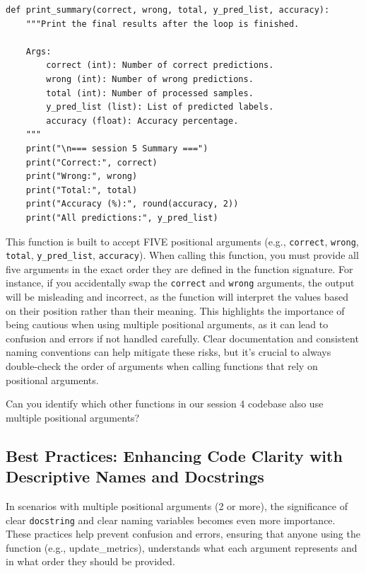\begin{verbatim}
def print_summary(correct, wrong, total, y_pred_list, accuracy):
    """Print the final results after the loop is finished.

    Args:
        correct (int): Number of correct predictions.
        wrong (int): Number of wrong predictions.
        total (int): Number of processed samples.
        y_pred_list (list): List of predicted labels.
        accuracy (float): Accuracy percentage.
    """
    print("\n=== session 5 Summary ===")
    print("Correct:", correct)
    print("Wrong:", wrong)
    print("Total:", total)
    print("Accuracy (%):", round(accuracy, 2))
    print("All predictions:", y_pred_list)     
\end{verbatim}

This function is built to accept FIVE  positional arguments (e.g., \texttt{correct}, \texttt{wrong}, \texttt{total}, \texttt{y\_pred\_list}, \texttt{accuracy}). 
When calling this function, you must provide all five arguments in the exact order they are defined in the function signature. For instance, if you accidentally swap the \texttt{correct} and \texttt{wrong} arguments, the output will be misleading and incorrect, as the function will interpret the values based on their position rather than their meaning. This highlights the importance of being cautious when using multiple positional arguments, as it can lead to confusion and errors if not handled carefully. Clear documentation and consistent naming conventions can help mitigate these risks, but it's crucial to always double-check the order of arguments when calling functions that rely on positional arguments.

\begin{tcolorbox}[title=Quiz]
Can you identify which other functions in our session 4 codebase also use multiple positional arguments?
\end{tcolorbox}


\subsection{Best Practices: Enhancing Code Clarity with Descriptive Names and Docstrings}

In scenarios with multiple positional arguments (2 or more), the significance of clear \texttt{docstring} and clear naming variables becomes even more importance. These practices help prevent confusion and errors, ensuring that anyone using the function (e.g., update\_metrics), understands what each argument represents and in what order they should be provided.

